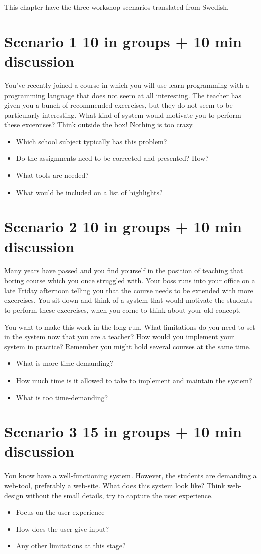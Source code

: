 This chapter have the three workshop scenarios translated from Swedish.

\section*{Scenario 1 10 in groups + 10 min discussion}
You've recently joined a course in which you will use learn programming with a programming language that does not seem at all interesting. The teacher has given you a bunch of recommended excercises, but they do not seem to be particularly interesting. What kind of system would motivate you to perform these excercises? Think outside the box! Nothing is too crazy.

\begin{itemize}
\item Which school subject typically has this problem?
\item Do the assignments need to be corrected and presented? How?
\item What tools are needed?
\item What would be included on a list of highlights?
\end{itemize}

\section*{Scenario 2 10 in groups + 10 min discussion}
Many years have passed and you find yourself in the position of teaching that boring course which you once struggled with. Your boss runs into your office on a late Friday afternoon telling you that the course needs to be extended with more excercises. You sit down and think of a system that would motivate the students to perform these excercises, when you come to think about your old concept.

You want to make this work in the long run. What limitations do you need to set in the system now that you are a teacher? How would you implement your system in practice? Remember you might hold several courses at the same time.

\begin{itemize}
\item What is more time-demanding?
\item How much time is it allowed to take to implement and maintain the system?
\item What is too time-demanding?
\end{itemize}

\section*{Scenario 3 15 in groups + 10 min discussion}
You know have a well-functioning system. However, the students are demanding a web-tool, preferably a web-site. What does this system look like? Think web-design without the small details, try to capture the user experience.

\begin{itemize}
\item Focus on the user experience
\item How does the user give input?
\item Any other limitations at this stage?
\end{itemize}
